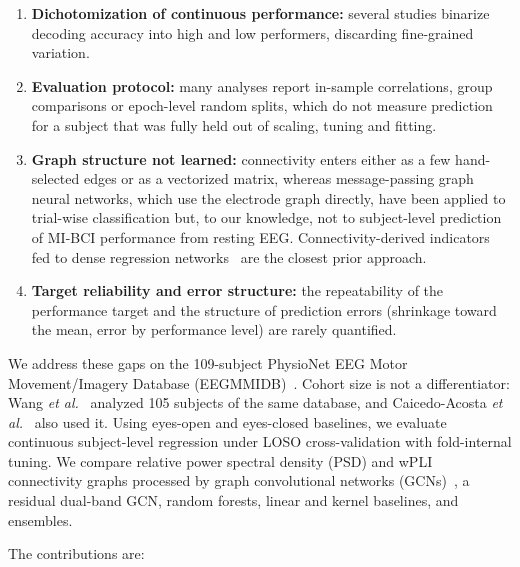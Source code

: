 \documentclass{ieeeaccess}
\begin{document}
\begin{enumerate}[leftmargin=*]
    \item \textbf{Dichotomization of continuous performance:} several studies binarize decoding accuracy into high and low performers, discarding fine-grained variation.
    \item \textbf{Evaluation protocol:} many analyses report in-sample correlations, group comparisons or epoch-level random splits, which do not measure prediction for a subject that was fully held out of scaling, tuning and fitting.
    \item \textbf{Graph structure not learned:} connectivity enters either as a few hand-selected edges or as a vectorized matrix, whereas message-passing graph neural networks, which use the electrode graph directly, have been applied to trial-wise classification but, to our knowledge, not to subject-level prediction of MI-BCI performance from resting EEG. Connectivity-derived indicators fed to dense regression networks~\cite{caicedo2021} are the closest prior approach.
    \item \textbf{Target reliability and error structure:} the repeatability of the performance target and the structure of prediction errors (shrinkage toward the mean, error by performance level) are rarely quantified.
\end{enumerate}

We address these gaps on the 109-subject PhysioNet EEG Motor Movement/Imagery Database (EEGMMIDB)~\cite{goldberger2000,physionet2009}. Cohort size is not a differentiator: Wang \textit{et al.}~\cite{wang2022} analyzed 105 subjects of the same database, and Caicedo-Acosta \textit{et al.}~\cite{caicedo2021} also used it. Using eyes-open and eyes-closed baselines, we evaluate continuous subject-level regression under LOSO cross-validation with fold-internal tuning. We compare relative power spectral density (PSD) and wPLI~\cite{vinck2011} connectivity graphs processed by graph convolutional networks (GCNs)~\cite{kipf2017}, a residual dual-band GCN, random forests, linear and kernel baselines, and ensembles.

The contributions are:
\end{document}
